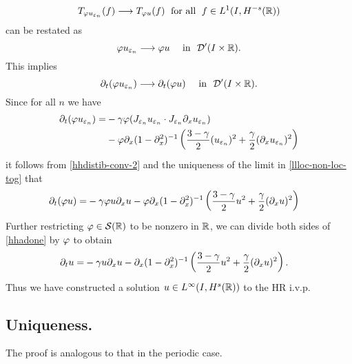 %
\begin{equation}
\label{hhweak-conv-2}
T_{\varphi u_{\varepsilon_n}}(f)  \longrightarrow  T_{\varphi u} (f) \;
\ \text{for all} \  \;  f \in L^1(I, H^{-s}(\mathbb{R}))
\end{equation}
%
can be restated as 
%
\begin{equation}
\varphi u_{\varepsilon_n}  \longrightarrow  \varphi u
\quad
\ \text{in} \  \,\,
\mathcal{D}'(I\times \mathbb{R}).
\end{equation}
%
This implies 
%
\begin{equation}
\label{hhdistib-conv-2}
\partial_t(\varphi u_{\varepsilon_n})  \longrightarrow  \partial_t (\varphi u)
\quad
\ \text{in} \   \,\, \mathcal{D}'(I\times \mathbb{R}).
\end{equation}
%
Since for all $n$ we have 
%
\begin{equation}
\begin{split}
\partial_t (\varphi u_{\varepsilon_n})
= & -\gamma \varphi
(J_{\varepsilon_n} u_{\varepsilon_n}  \cdot
J_{\varepsilon_n}\partial_x u_{\varepsilon_n})
\\
& -
\varphi \partial_x(1- \partial_x^2)^{-1} \left( \frac{3-\gamma}{2} (u_{\varepsilon_n})^2
+ \frac{\gamma}{2} (\partial_x u_{\varepsilon_n})^2 \right )
\end{split}
\end{equation}
%
it follows from \eqref{hhdistib-conv-2} and the uniqueness of the
limit in \eqref{llloc-non-loc-tog} that
\begin{equation}
\begin{split}
\partial_t (\varphi u)
= & -\gamma \varphi
u \partial_x u - \varphi \partial_x(1- \partial_x^2)^{-1} \left( \frac{3-\gamma}{2} u^2
+ \frac{\gamma}{2} (\partial_x u)^2 \right )
\label{hhadone}
\end{split}
\end{equation}
Further restricting $\varphi \in \mathcal{S}(\mathbb{R})$ to be nonzero in
$\mathbb{R}$, we
can divide both sides of \eqref{hhadone} by $\varphi$ to obtain
\begin{equation}
\label{hh2yy}
\begin{split}
\partial_t  u
= & -\gamma
u \partial_x u - \partial_x(1- \partial_x^2)^{-1} \left( \frac{3-\gamma}{2} u^2
+ \frac{\gamma}{2} (\partial_x u)^2 \right ).
\end{split}
\end{equation}
Thus we have constructed a solution $u \in L^\infty(I, H^s(\mathbb{R}))$
to the HR i.v.p. 
\subsection{Uniqueness.} The proof is analogous to that in the periodic case.
